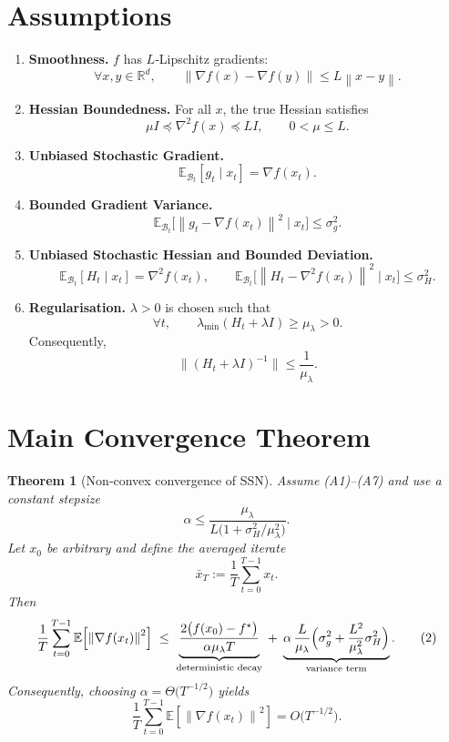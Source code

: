 \documentclass{article}
\newtheorem{theorem}{Theorem}
\newcommand{\E}{\mathbb{E}}
\newcommand{\R}{\mathbb{R}}
\newcommand{\norm}[1]{\left\|#1\right\|}
\begin{document}
\section*{Assumptions}
\begin{enumerate}
\item \textbf{Smoothness.} $f$ has $L$‑Lipschitz gradients:
\[
\forall x,y\in\R^{d},\qquad \norm{\nabla f(x)-\nabla f(y)}\le L\norm{x-y}. \tag{A1}
\]

\item \textbf{Hessian Boundedness.} For all $x$, the true Hessian satisfies
\[
\mu I \preceq \nabla^{2}f(x) \preceq L I ,\qquad 0<\mu\le L. \tag{A2}
\]

\item \textbf{Unbiased Stochastic Gradient.}
\[
\E_{\mathcal{B}_{t}}[g_{t}\mid x_{t}]=\nabla f(x_{t}). \tag{A3}
\]

\item \textbf{Bounded Gradient Variance.}
\[
\E_{\mathcal{B}_{t}}\big[\norm{g_{t}-\nabla f(x_{t})}^{2}\mid x_{t}\big]\le\sigma_{g}^{2}. \tag{A4}
\]

\item \textbf{Unbiased Stochastic Hessian and Bounded Deviation.}
\[
\E_{\mathcal{B}_{t}}[H_{t}\mid x_{t}]=\nabla^{2}f(x_{t}),\qquad
\E_{\mathcal{B}_{t}}\big[\norm{H_{t}-\nabla^{2}f(x_{t})}^{2}\mid x_{t}\big]\le\sigma_{H}^{2}. \tag{A5}
\]

\item \textbf{Regularisation.} $\lambda>0$ is chosen such that
\[
\forall t,\qquad \lambda_{\min}(H_{t}+\lambda I)\ge \mu_{\lambda}>0 . \tag{A6}
\]
Consequently,
\[
\|(H_{t}+\lambda I)^{-1}\|\le \frac{1}{\mu_{\lambda}} . \tag{A7}
\]
\end{enumerate}

\section*{Main Convergence Theorem}
\begin{theorem}[Non‑convex convergence of SSN]\label{thm:main}
Assume (A1)–(A7) and use a constant stepsize 
\[
\alpha\le \frac{\mu_{\lambda}}{L\bigl(1+\sigma_{H}^{2}/\mu_{\lambda}^{2}\bigr)} .
\]
Let $x_{0}$ be arbitrary and define the averaged iterate
\[
\bar x_{T}:=\frac{1}{T}\sum_{t=0}^{T-1}x_{t}.
\]
Then
\[
\frac{1}{T}\sum_{t=0}^{T-1}\E\!\left[\norm{\nabla f(x_{t})}^{2}\right]
\;\le\;
\underbrace{\frac{2\bigl(f(x_{0})-f^{\star}\bigr)}{\alpha\mu_{\lambda} T}}_{\text{deterministic decay}}
\;+\;
\underbrace{\alpha\,\frac{L}{\mu_{\lambda}}
\Bigl(\sigma_{g}^{2}+ \frac{L^{2}}{\mu_{\lambda}^{2}}\sigma_{H}^{2}\Bigr)}_{\text{variance term}} .
\tag{2}
\]
Consequently, choosing $\alpha = \Theta\!\bigl(T^{-1/2}\bigr)$ yields
\[
\frac{1}{T}\sum_{t=0}^{T-1}\E\!\left[\norm{\nabla f(x_{t})}^{2}\right]=O\!\bigl(T^{-1/2}\bigr).
\]
\end{theorem}
\end{document}
